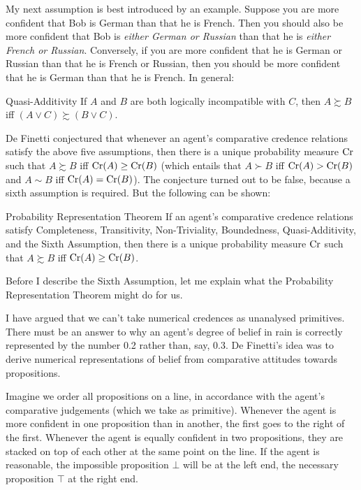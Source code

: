 My next assumption is best introduced by an example. Suppose you are
more confident that Bob is German than that he is French.  Then you
should also be more confident that Bob is \emph{either German or
  Russian} than that he is \emph{either French or
  Russian}. Conversely, if you are more confident that he is German or
Russian than that he is French or Russian, then you should be more
confident that he is German than that he is French. In general:

\begin{genericthm}{Quasi-Additivity}
  If $A$ and $B$ are both logically incompatible with $C$, then $A
  \succsim B$ iff $(A \lor C) \succsim (B \lor C)$.
\end{genericthm}

De Finetti conjectured that whenever an agent's comparative credence relations
satisfy the above five assumptions, then there is a unique probability measure
$\text{Cr}$ such that $A \succsim B$ iff $\text{Cr}(A) \geq \text{Cr}(B)$ (which entails that
$A \succ B$ iff $\text{Cr}(A) > \text{Cr}(B)$ and $A \sim B$ iff $\text{Cr}(A) = \text{Cr}(B)$). The
conjecture turned out to be false, because a sixth assumption is required. But
the following can be shown:
%
\begin{genericthm}{Probability Representation Theorem}
  If an agent's comparative credence relations satisfy Completeness,
  Transitivity, Non-Triviality, Boundedness, Quasi-Additivity, and the
  Sixth Assumption, then there is a unique probability measure $\text{Cr}$
  such that $A \succsim B$ iff $\text{Cr}(A) \geq \text{Cr}(B)$.
\end{genericthm}
%
Before I describe the Sixth Assumption, let me explain what the
Probability Representation Theorem might do for us.

I have argued that we can't take numerical credences as unanalysed primitives.
There must be an answer to why an agent's degree of belief in rain is correctly
represented by the number 0.2 rather than, say, 0.3. De Finetti's idea was to
derive numerical representations of belief from comparative attitudes towards
propositions.

Imagine we order all propositions on a line, in accordance with the agent's
comparative judgements (which we take as primitive). Whenever the agent is more
confident in one proposition than in another, the first goes to the right of the
first. Whenever the agent is equally confident in two propositions, they are
stacked on top of each other at the same point on the line. If the agent is
reasonable, the impossible proposition $\bot$ will be at the left end, the
necessary proposition $\top$ at the right end.


